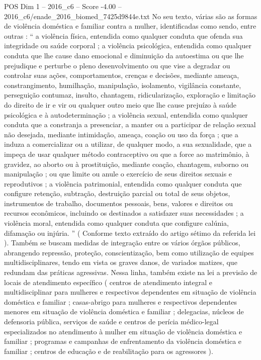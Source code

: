 \begin{textsample}{POS Dim 1 – 2016\_c6 – Score -4.00 – 2016\_c6/enade\_2016\_biomed\_7425d9844e.txt}
No seu texto, várias são as formas de violência doméstica e familiar contra a mulher, identificadas como sendo, entre outras : “ a violência física, entendida como qualquer conduta que ofenda sua integridade ou saúde corporal ; a violência psicológica, entendida como qualquer conduta que lhe cause dano emocional e diminuição da autoestima ou que lhe prejudique e perturbe o pleno desenvolvimento ou que vise a degradar ou controlar suas ações, comportamentos, crenças e decisões, mediante ameaça, constrangimento, humilhação, manipulação, isolamento, vigilância constante, perseguição contumaz, insulto, chantagem, ridicularização, exploração e limitação do direito de ir e vir ou qualquer outro meio que lhe cause prejuízo à saúde psicológica e à autodeterminação ; a violência sexual, entendida como qualquer conduta que a constranja a presenciar, a manter ou a participar de relação sexual não desejada, mediante intimidação, ameaça, coação ou uso da força ; que a induza a comercializar ou a utilizar, de qualquer modo, a sua sexualidade, que a impeça de usar qualquer método contraceptivo ou que a force ao matrimônio, à gravidez, ao aborto ou à prostituição, mediante coação, chantagem, suborno ou manipulação ; ou que limite ou anule o exercício de seus direitos sexuais e reprodutivos ; a violência patrimonial, entendida como qualquer conduta que configure retenção, subtração, destruição parcial ou total de seus objetos, instrumentos de trabalho, documentos pessoais, bens, valores e direitos ou recursos econômicos, incluindo os destinados a satisfazer suas necessidades ; a violência moral, entendida como qualquer conduta que configure calúnia, difamação ou injúria. ” ( Conforme texto extraído do artigo sétimo da referida lei ).
Também se buscam medidas de integração entre os vários órgãos públicos, abrangendo repressão, proteção, conscientização, bem como utilização de equipes multidisciplinares, tendo em vista os graves danos, de variados matizes, que redundam das práticas agressivas.
Nessa linha, também existe na lei a previsão de locais de atendimento específico ( centros de atendimento integral e multidisciplinar para mulheres e respectivos dependentes em situação de violência doméstica e familiar ; casas-abrigo para mulheres e respectivos dependentes menores em situação de violência doméstica e familiar ; delegacias, núcleos de defensoria pública, serviços de saúde e centros de perícia médico-legal especializados no atendimento à mulher em situação de violência doméstica e familiar ; programas e campanhas de enfrentamento da violência doméstica e familiar ; centros de educação e de reabilitação para os agressores ).

\end{textsample}
